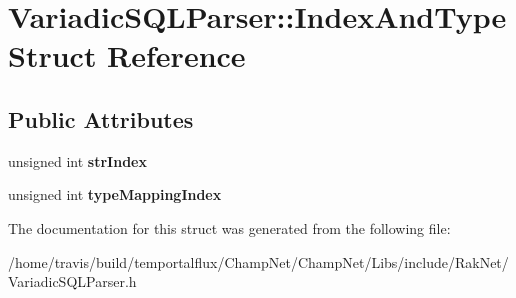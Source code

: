 \hypertarget{struct_variadic_s_q_l_parser_1_1_index_and_type}{\section{Variadic\-S\-Q\-L\-Parser\-:\-:Index\-And\-Type Struct Reference}
\label{struct_variadic_s_q_l_parser_1_1_index_and_type}
}
\subsection*{Public Attributes}
\begin{DoxyCompactItemize}
\item 
\hypertarget{struct_variadic_s_q_l_parser_1_1_index_and_type_aac47b5fb94abaa046821cd7c422a7708}{unsigned int {\bfseries str\-Index}}\label{struct_variadic_s_q_l_parser_1_1_index_and_type_aac47b5fb94abaa046821cd7c422a7708}

\item 
\hypertarget{struct_variadic_s_q_l_parser_1_1_index_and_type_a2b3dd0aa69baa4626c2fb2aa0c09109c}{unsigned int {\bfseries type\-Mapping\-Index}}\label{struct_variadic_s_q_l_parser_1_1_index_and_type_a2b3dd0aa69baa4626c2fb2aa0c09109c}

\end{DoxyCompactItemize}


The documentation for this struct was generated from the following file\-:\begin{DoxyCompactItemize}
\item 
/home/travis/build/temportalflux/\-Champ\-Net/\-Champ\-Net/\-Libs/include/\-Rak\-Net/Variadic\-S\-Q\-L\-Parser.\-h\end{DoxyCompactItemize}
